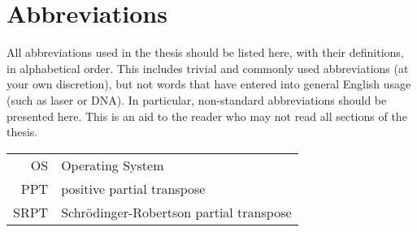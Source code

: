\chapter*{Abbreviations}

All abbreviations used in the thesis should be listed here, with their definitions, in alphabetical order.  This includes trivial and commonly used abbreviations (at your own discretion), but not words that have entered into general English usage (such as laser or DNA).  In particular, non-standard abbreviations should be presented here.  This is an aid to the reader who may not read all sections of the thesis. \\ %

\begin{longtable}{rl}
OS & Operating System\\
PPT & positive partial transpose\\
SRPT & Schr\"odinger-Robertson partial transpose
\end{longtable}
